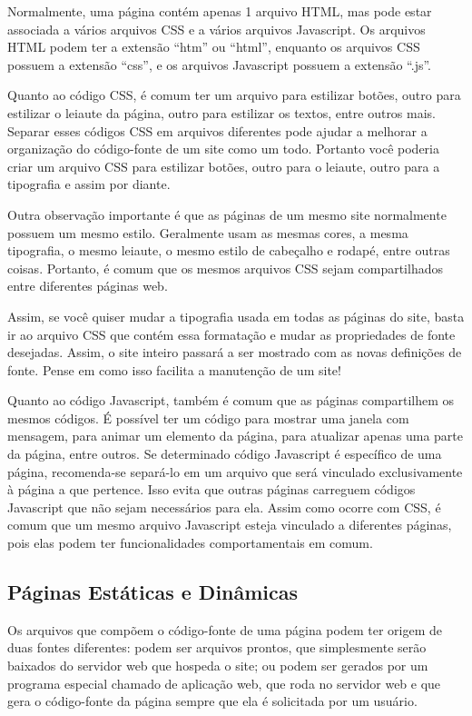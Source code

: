 Normalmente, uma página contém apenas 1 arquivo HTML, mas pode estar associada a vários arquivos CSS e a vários arquivos Javascript. Os arquivos HTML podem ter a extensão ``htm'' ou ``html'', enquanto os arquivos CSS possuem a extensão ``css'', e os arquivos Javascript possuem a extensão ``.js''.

Quanto ao código CSS, é comum ter um arquivo para estilizar botões, outro para estilizar o leiaute da página, outro para estilizar os textos, entre outros mais. Separar esses códigos CSS em arquivos diferentes pode ajudar a melhorar a organização do código-fonte de um site como um todo. Portanto você poderia criar um arquivo CSS para estilizar botões, outro para o leiaute, outro para a tipografia e assim por diante.

Outra observação importante é que as páginas de um mesmo site normalmente possuem um mesmo estilo. Geralmente usam as mesmas cores, a mesma tipografia, o mesmo leiaute, o mesmo estilo de cabeçalho e rodapé, entre outras coisas. Portanto, é comum que os mesmos arquivos CSS sejam compartilhados entre diferentes páginas web.

Assim, se você quiser mudar a tipografia usada em todas as páginas do site, basta ir ao arquivo CSS que contém essa formatação e mudar as propriedades de fonte desejadas. Assim, o site inteiro passará a ser mostrado com as novas definições de fonte. Pense em como isso facilita a manutenção de um site!

Quanto ao código Javascript, também é comum que as páginas compartilhem os mesmos códigos. É possível ter um código para mostrar uma janela com mensagem, para animar um elemento da página, para atualizar apenas uma parte da página, entre outros. Se determinado código Javascript é específico de uma página, recomenda-se separá-lo em um arquivo que será vinculado exclusivamente à página a que pertence. Isso evita que outras páginas carreguem códigos Javascript que não sejam necessários para ela. Assim como ocorre com CSS, é comum que um mesmo arquivo Javascript esteja vinculado a diferentes páginas, pois elas podem ter funcionalidades comportamentais em comum.

\subsection{Páginas Estáticas e Dinâmicas}

Os arquivos que compõem o código-fonte de uma página podem ter origem de duas fontes diferentes: podem ser arquivos prontos, que simplesmente serão baixados do servidor web que hospeda o site; ou podem ser gerados por um programa especial chamado de aplicação web, que roda no servidor web e que gera o código-fonte da página sempre que ela é solicitada por um usuário.


